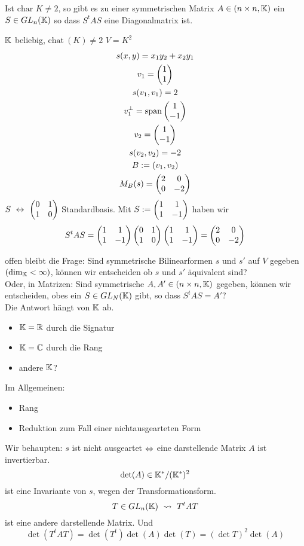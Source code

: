 \begin{Kor}
  Ist $\text{char } K\neq 2$, so gibt es zu einer symmetrischen Matrix $A\in(n\times n, \mathbb{K})$ ein $S\in GL_n(\mathbb{K})$ so dass $S^tAS$ eine Diagonalmatrix ist.
\end{Kor}
\begin{Bsp}
  $\mathbb{K}$ beliebig, $\text{chat}\ (K)\neq 2$ $V=K^2$
  \begin{gather*}
    s(x,y)=x_1y_2+x_2y_1\\
    v_1=\begin{pmatrix}1\\1\end{pmatrix} \\ s(v_1,v_1)=2\\
    v_1^\perp = \operatorname{span}\begin{pmatrix}1\\-1\end{pmatrix}\\ v_2=\begin{pmatrix}1\\-1\end{pmatrix}\\
    s(v_2,v_2)=-2\\
    B:=(v_1,v_2)\\ M_B(s)=\begin{pmatrix}2&0\\0&-2\end{pmatrix}
  \end{gather*}
  $S\ \lra\ \Mx{0&1\\1&0}$ Standardbasis. Mit $S:=\begin{pmatrix}1&1\\1&-1\end{pmatrix}$ haben wir
  \[S^tAS=\begin{pmatrix}1&1\\1&-1\end{pmatrix}\begin{pmatrix}0&1\\1&0\end{pmatrix}\begin{pmatrix}1&1\\1&-1\end{pmatrix}=\begin{pmatrix}2&0\\0&-2\end{pmatrix}\]
\end{Bsp}
\begin{Bem}
  offen bleibt die Frage: Sind symmetrische Bilinearformen $s$ und $s'$ auf $V$ gegeben $(\dim_{\mathbb{K}}<\infty)$, können wir entscheiden ob $s$ und $s'$ äquivalent sind?\\
  Oder, in Matrizen: Sind symmetrische $A,A'\in (n\times n, \mathbb{K})$ gegeben, können wir entscheiden, obes ein $S\in GL_N(\mathbb{K})$ gibt, so dass $S^tAS=A'$?\\
  Die Antwort hängt von $\mathbb{K}$ ab.
  \begin{itemize}
    \item $\mathbb{K}=\mathbb{R}$ durch die Signatur
    \item $\mathbb{K}=\mathbb{C}$ durch die Rang
    \item andere $\mathbb{K}$?
  \end{itemize}
  Im Allgemeinen:
  \begin{itemize}
    \item Rang
    \item Reduktion zum Fall einer nichtausgearteten Form
  \end{itemize}
  Wir behaupten: $s$ ist nicht ausgeartet $\Leftrightarrow$ eine darstellende Matrix $A$ ist invertierbar.
  \[\det(A)\in \mathbb{K}^*/( \mathbb{K}^*)^2\]
  ist eine Invariante von $s$, wegen der Transformationsform.
  \[T\in GL_n(\mathbb{K})\ \rightsquigarrow\ T^tAT\]
  ist eine andere darstellende Matrix. Und
  \[\det(T^tAT)=\det(T^t)\det(A)\det(T)=(\det T)^2\det(A)\]
\end{Bem}

